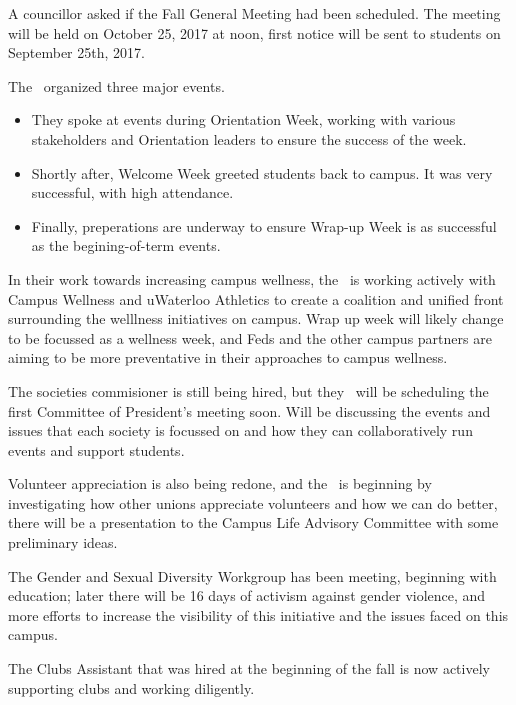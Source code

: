     A councillor asked if the Fall General Meeting had been scheduled. The 
    meeting will be held on October 25, 2017 at noon, first notice will be sent
    to students on September 25th, 2017. 


\begin{information}

    The \vpi\ organized three major events.  
    \begin{itemize}
        \item They spoke at events during Orientation Week, working with 
            various stakeholders and Orientation leaders to ensure the success
            of the week.
        \item Shortly after, Welcome Week greeted students back to campus. 
            It was very successful, with high attendance.  
        \item Finally, preperations are underway to ensure Wrap-up Week is as
            successful as the begining-of-term events. 
    \end{itemize}

    In their work towards increasing campus wellness, the \vpi\ is working 
    actively with Campus Wellness and uWaterloo Athletics to create a 
    coalition and unified front surrounding the welllness initiatives on campus. 
    Wrap up week will likely change to be focussed as a wellness week, and Feds
    and the other campus partners are aiming to be more preventative in their
    approaches to campus wellness. 

    The societies commisioner is still being hired, but they \vpi\ will be 
    scheduling the first Committee of President's meeting soon. Will be 
    discussing the events and issues that each society is focussed on and how 
    they can collaboratively run events and support students.

    Volunteer appreciation is also being redone, and the \vpi\ is beginning 
    by investigating how other unions appreciate volunteers and how we can do 
    better, there will be a presentation to the Campus Life Advisory Committee 
    with some preliminary ideas.

    The Gender and Sexual Diversity Workgroup has been meeting, beginning with
    education; later there will be 16 days of activism against gender violence,
    and more efforts to increase the visibility of this initiative and the 
    issues faced on this campus. 

    The Clubs Assistant that was hired at the beginning of the fall is now 
    actively supporting clubs and working diligently. 
    
\end{information}

